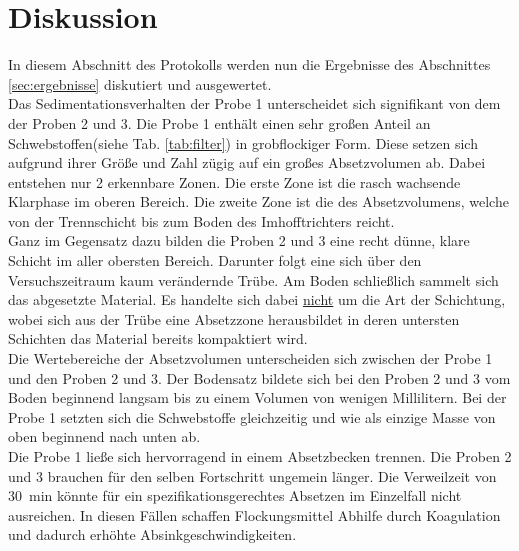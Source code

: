 \chapter{Diskussion}
\label{sec:diskussion}
In diesem Abschnitt des Protokolls werden nun die Ergebnisse des Abschnittes \ref{sec:ergebnisse} diskutiert und ausgewertet.\\


Das Sedimentationsverhalten der Probe 1 unterscheidet sich signifikant von dem der Proben 2 und 3. Die Probe 1 enthält einen sehr großen Anteil an Schwebstoffen\linebreak (siehe Tab. \ref{tab:filter}) in grobflockiger Form. Diese setzen sich aufgrund ihrer Größe und Zahl zügig auf ein großes Absetzvolumen ab. Dabei entstehen nur 2 erkennbare Zonen. Die erste Zone ist die rasch wachsende Klarphase im oberen Bereich. Die zweite Zone ist die des Absetzvolumens, welche von der Trennschicht bis zum Boden des Imhofftrichters reicht.\\
Ganz im Gegensatz dazu bilden die Proben 2 und 3 eine recht dünne, klare Schicht im aller obersten Bereich. Darunter folgt eine sich über den Versuchszeitraum kaum verändernde Trübe. Am Boden schließlich sammelt sich das abgesetzte Material. Es handelte sich dabei \underline{nicht} um die Art der Schichtung, wobei sich aus der Trübe eine Absetzzone herausbildet in deren untersten Schichten das Material bereits kompaktiert wird.\\
Die Wertebereiche der Absetzvolumen unterscheiden sich zwischen der Probe 1 und den Proben 2 und 3. Der Bodensatz bildete sich bei den Proben 2 und 3 vom Boden beginnend langsam bis zu einem Volumen von wenigen Millilitern.
Bei der Probe 1 setzten sich  die Schwebstoffe gleichzeitig und wie als einzige Masse von oben beginnend nach unten ab.\\
Die Probe 1 ließe sich hervorragend in einem Absetzbecken trennen. Die Proben 2 und 3 brauchen für den selben Fortschritt ungemein länger. Die Verweilzeit von \SI{30}{\minute} könnte für ein spezifikationsgerechtes Absetzen im Einzelfall nicht ausreichen. In diesen Fällen schaffen Flockungsmittel Abhilfe durch Koagulation und dadurch erhöhte Absinkgeschwindigkeiten.\\




